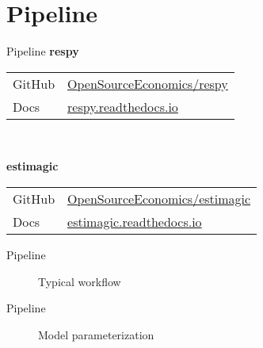 \section{Pipeline}
\begin{frame}{Pipeline}
\textbf{respy}\\\vspace{0.3cm}
\begin{tabular}{ll}
GitHub  & \url{OpenSourceEconomics/respy}\\
Docs    & \url{respy.readthedocs.io}\\
\end{tabular}\\\vspace{1cm}

\textbf{estimagic}\\\vspace{0.3cm}
\begin{tabular}{ll}
GitHub	& \url{OpenSourceEconomics/estimagic}\\
Docs    & \url{estimagic.readthedocs.io}\\
\end{tabular}

\end{frame}
\begin{frame}{Pipeline}
  \begin{figure}\scriptsize
    \caption{Typical workflow}
         
   \end{figure}
\end{frame}
\begin{frame}{Pipeline}

	\begin{figure}[h!]\centering
	\caption{Model parameterization}\label{Model parameterization}
	\end{figure}

\end{frame}
